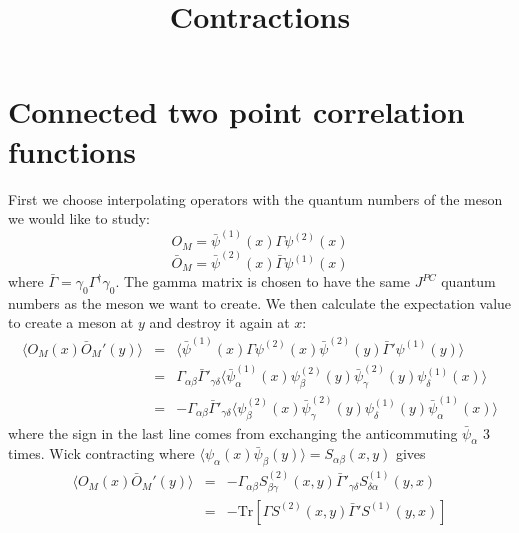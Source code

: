 \documentclass[3p,preprint]{elsarticle}
\begin{document}
\title{Contractions}

\section{Connected two point correlation functions}

First we choose interpolating operators with the quantum numbers of the meson we would like to study:
\begin{equation}
O_M = \bar{\psi}^{(1)}(x) \Gamma \psi^{(2)}(x)
\end{equation}
\begin{equation}
\bar{O}_M = \bar{\psi}^{(2)}(x) \bar{ \Gamma } \psi^{(1)}(x)
\end{equation}
where $\bar{ \Gamma } = \gamma_0 \Gamma^\dagger \gamma_0$. The gamma matrix is chosen to have the same $J^{PC}$
quantum numbers as the meson we want to create. We then calculate the expectation value to create a meson at
$y$ and destroy it again at $x$:
\begin{eqnarray}
\langle O_M(x) \bar{O}_M'(y) \rangle &=& \langle \bar{\psi}^{(1)}(x) \Gamma \psi^{(2)}(x) \bar{\psi}^{(2)}(y) \bar{ \Gamma }' \psi^{(1)}(y) \rangle
\\
&=& \Gamma_{\alpha \beta} \bar{ \Gamma }'_{\gamma \delta} \langle \bar{\psi}^{(1)}_\alpha(x)  \psi^{(2)}_\beta(y) \bar{\psi}^{(2)}_\gamma(y)  \psi^{(1)}_\delta(x) \rangle \\
&=& -\Gamma_{\alpha \beta} \bar{ \Gamma }'_{\gamma \delta} \langle \psi^{(2)}_\beta(x) \bar{\psi}^{(2)}_\gamma(y)  \psi^{(1)}_\delta(y)
\bar{\psi}^{(1)}_\alpha (x) \rangle
\end{eqnarray}
where the sign in the last line comes from exchanging the anticommuting $\bar{\psi}_\alpha$ 3 times. Wick contracting where $\langle \psi_\alpha(x) \bar{\psi}_\beta(y) \rangle = S_{\alpha \beta}(x,y)$ gives
\begin{eqnarray}
\langle O_M(x) \bar{O}_M'(y) \rangle &=& -\Gamma_{\alpha \beta} S^{(2)}_{\beta \gamma} (x,y) \bar{ \Gamma }'_{\gamma \delta} S^{(1)}_{\delta \alpha} (y,x) \\
&=& -\text{Tr}\left[ \Gamma S^{(2)} (x,y) \bar{ \Gamma }' S^{(1)} (y,x) \right]
\end{eqnarray}
\end{document}
